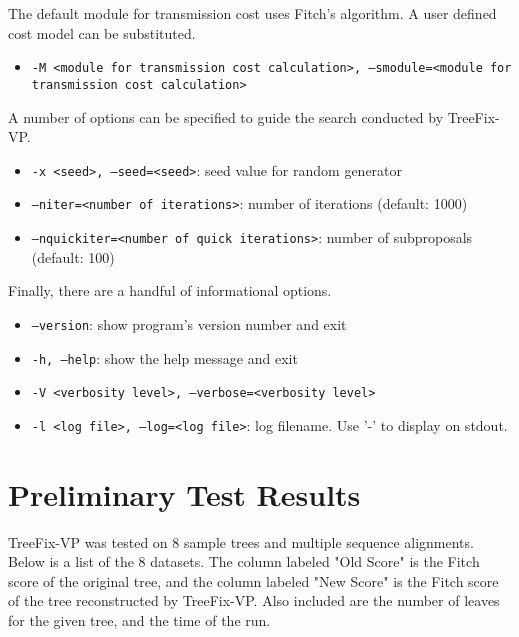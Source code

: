 \documentclass[11pt]{article}
\begin{document}
The default module for transmission cost uses Fitch's algorithm. A user defined cost model can
be substituted.

\begin{itemize}
    \item \texttt{-M <module for transmission cost calculation>, --smodule=<module for transmission cost calculation>}
\end{itemize}

A number of options can be specified to guide the search conducted by TreeFix-VP.

\begin{itemize}
    \item \texttt{-x <seed>, --seed=<seed>}: seed value for random generator
    \item \texttt{--niter=<number of iterations>}: number of iterations (default: 1000)
    \item \texttt{--nquickiter=<number of quick iterations>}: number of subproposals (default: 100)
\end{itemize}

Finally, there are a handful of informational options.

\begin{itemize}
    \item \texttt{--version}: show program's version number and exit
    \item \texttt{-h, --help}: show the help message and exit
    \item \texttt{-V <verbosity level>, --verbose=<verbosity level>}
    \item \texttt{-l <log file>, --log=<log file>}: log filename.  Use '-' to display on stdout.
\end{itemize}

\section{Preliminary Test Results}
TreeFix-VP was tested on 8 sample trees and multiple sequence alignments. Below is a list of
the 8 datasets. The column labeled "Old Score" is the Fitch score of the original tree, and the column
labeled "New Score" is the Fitch score of the tree reconstructed by TreeFix-VP. Also included are the number
of leaves for the given tree, and the time of the run.
\end{document}

